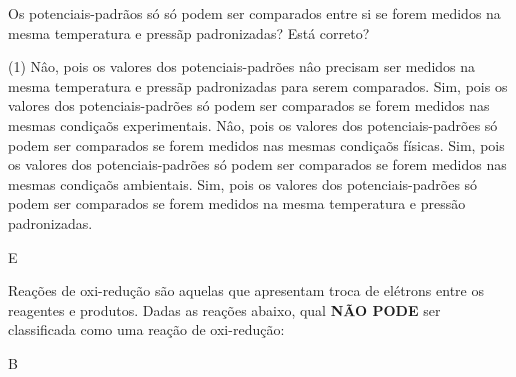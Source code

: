 \documentclass[9qpt]{scrartcl}
\begin{document}
\begin{exercise}[points=1]
Os potenciais-padrãos só só podem ser comparados entre si se forem medidos na mesma temperatura e pressãp padronizadas? Está correto?


\begin{choice}(1)
\choice Nâo, pois os valores dos potenciais-padrões nâo precisam ser medidos na mesma temperatura e pressãp padronizadas para serem comparados.
\choice  Sim, pois os valores dos potenciais-padrões só podem ser comparados se forem medidos nas mesmas condiçaõs experimentais.
\choice Nâo, pois os valores dos potenciais-padrões só podem ser comparados se forem medidos nas mesmas condiçaõs físicas.
\choice Sim, pois os valores dos potenciais-padrões só podem ser comparados se forem medidos nas mesmas condiçaõs ambientais.
\choice Sim, pois os valores dos potenciais-padrões só podem ser comparados se forem medidos na mesma temperatura e pressão padronizadas.
\end{choice}
\end{exercise}
\begin{solution}
E
\end{solution}


\begin{exercise}[points=1]
Reações de oxi-redução são aquelas que apresentam troca de elétrons entre os reagentes e produtos. Dadas as reações abaixo, qual \textbf{NÃO PODE} ser classificada como uma reação de oxi-redução:

\begin{choice}
\choice {}
\choice {}
\choice {}
\choice {}
\choice {}
\end{choice}
\end{exercise}
\begin{solution}
B
\end{solution}
\end{document}
